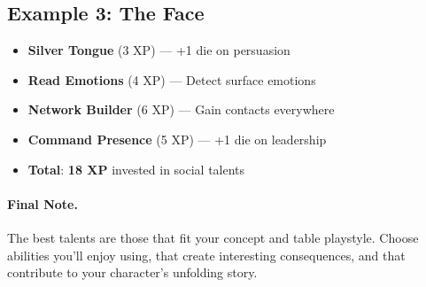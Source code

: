 \begin{multicols}{2}
\subsection*{Example 3: The Face}
\begin{itemize}
\item \textbf{Silver Tongue} (3 XP) --- +1 die on persuasion
\item \textbf{Read Emotions} (4 XP) --- Detect surface emotions
\item \textbf{Network Builder} (6 XP) --- Gain contacts everywhere
\item \textbf{Command Presence} (5 XP) --- +1 die on leadership
\item \textbf{Total}: \textbf{18 XP} invested in social talents
\end{itemize}

\paragraph{Final Note.}
The best talents are those that fit your concept and table playstyle. Choose abilities you’ll enjoy using, that create interesting consequences, and that contribute to your character’s unfolding story.

\end{multicols}

